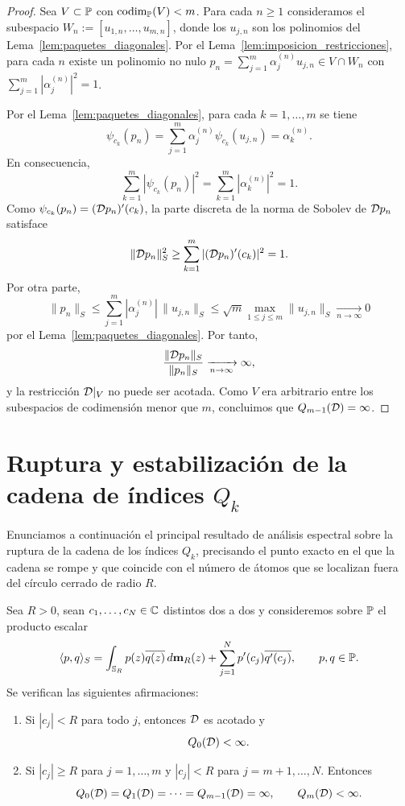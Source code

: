 \begin{proof}
	Sea $V\subset\mathbb{P}$ con $\operatorname{codim}_{\mathbb{P}}(V)<m$. Para cada $n\ge1$ consideramos el subespacio $W_n:=[u_{1,n},\dots,u_{m,n}]$, donde los $u_{j,n}$ son los polinomios del Lema~\ref{lem:paquetes_diagonales}. Por el Lema~\ref{lem:imposicion_restricciones}, para cada $n$ existe un polinomio no nulo $p_n=\sum_{j=1}^m \alpha_j^{(n)}u_{j,n}\in V\cap W_n$ con $\sum_{j=1}^m |\alpha_j^{(n)}|^2=1$.

	Por el Lema~\ref{lem:paquetes_diagonales}, para cada $k=1,\dots,m$ se tiene
	\[
		\psi_{c_k}(p_n)=\sum_{j=1}^m \alpha_j^{(n)}\psi_{c_k}(u_{j,n})=\alpha_k^{(n)}.
	\]
	En consecuencia,
	\[
		\sum_{k=1}^m |\psi_{c_k}(p_n)|^2
		=
		\sum_{k=1}^m |\alpha_k^{(n)}|^2
		=
		1.
	\]
	Como $\psi_{c_k}(p_n)=(\mathcal{D} p_n)'(c_k)$, la parte discreta de la norma de Sobolev de $\mathcal{D} p_n$ satisface
	\[
		\|\mathcal{D} p_n\|_S^2\ge \sum_{k=1}^m |(\mathcal{D} p_n)'(c_k)|^2=1.
	\]
	Por otra parte,
	\[
		\|p_n\|_S
		\le
		\sum_{j=1}^m |\alpha_j^{(n)}|\,\|u_{j,n}\|_S
		\le
		\sqrt m\max_{1\le j\le m}\|u_{j,n}\|_S
		\xrightarrow[n\to\infty]{}0
	\]
	por el Lema~\ref{lem:paquetes_diagonales}. Por tanto,
	\[
		\frac{\|\mathcal{D} p_n\|_S}{\|p_n\|_S}\xrightarrow[n\to\infty]{}\infty,
	\]
	y la restricción $\mathcal{D}|_V$ no puede ser acotada. Como $V$ era arbitrario entre los subespacios de codimensión menor que $m$, concluimos que $Q_{m-1}(\mathcal{D})=\infty$.
\end{proof}

\section{Ruptura y estabilización de la cadena de índices $Q_k$}

Enunciamos a continuación el principal resultado de análisis espectral sobre la ruptura de la cadena de los índices $Q_k$, precisando el punto exacto en el que la cadena se rompe y que coincide con el número de átomos que se localizan fuera del círculo cerrado de radio $R$.

\begin{thm}\label{thm:estabilizacion}
	Sea $R>0$, sean $c_1,\dots,c_N\in\mathbb{C}$ distintos dos a dos y consideremos sobre $\mathbb{P}$ el producto escalar
	\[
		\langle p,q\rangle_S
		=
		\int_{\mathbb{S}_R} p(z)\overline{q(z)}\,d\mathbf{m}_R(z)
		+
		\sum_{j=1}^N p'(c_j)\overline{q'(c_j)},
		\qquad p,q\in\mathbb{P}.
	\]
	Se verifican las siguientes afirmaciones:
	\begin{enumerate}
		\item Si $|c_j|<R$ para todo $j$, entonces $\mathcal{D}$ es acotado y
		      \[
			      Q_0(\mathcal{D})<\infty.
		      \]
		\item Si $|c_j|\ge R$ para $j=1,\dots,m$ y $|c_j|<R$ para $j=m+1,\dots,N$. Entonces
		      \[
			      Q_0(\mathcal{D})=Q_1(\mathcal{D})=\cdots=Q_{m-1}(\mathcal{D})=\infty,
			      \qquad
			      Q_m(\mathcal{D})<\infty.
		      \]
	\end{enumerate}
\end{thm}

